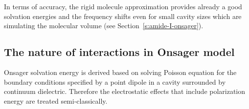 \documentclass[a4paper,titlepage,twoside,fleqn,12pt]{book}
\begin{document}
\begin{refsection}
In terms of accuracy, the rigid molecule approximation
provides already a good solvation energies and the frequency shifts
even for small cavity sizes which are simulating the molecular
volume
(see Section~\ref{s:amide-I-onsager}). 

\subsection{The nature of interactions in Onsager model}

Onsager solvation energy is derived based on solving Poisson
equation for the boundary conditions specified by a point
dipole in a cavity surrounded by continuum dielectric.
Therefore the electrostatic effects that include polarization
energy are treated semi\hyp{}classically.


\end{refsection}
\end{document}
